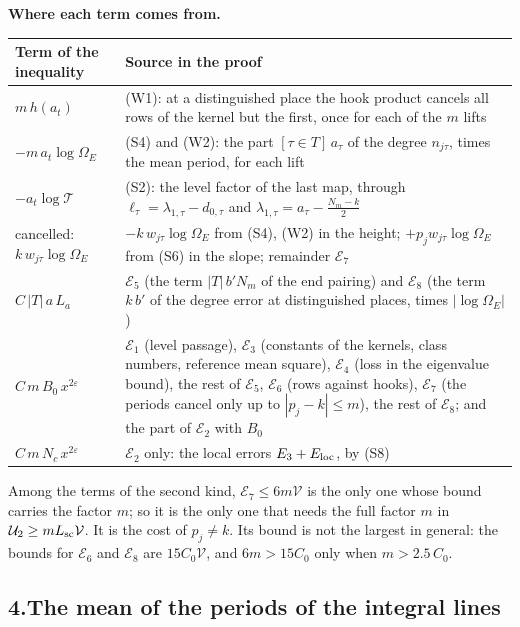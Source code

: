 \documentclass[11pt,letterpaper]{article}
\begin{document}
\medskip
\noindent\textbf{Where each term comes from.}
\begin{center}\small
\begin{tabular}{p{}p{}}
\toprule
Term of the inequality & Source in the proof\\
\midrule
$m\,h(a_t)$ & (W1): at a distinguished place the hook product cancels all rows of the kernel but the
first, once for each of the $m$ lifts\\
$-m\,a_t\log\Omega_E$ & (S4) and (W2): the part $[\tau\in T]\,a_\tau$ of the degree $n_{j\tau}$, times the
mean period, for each lift\\
$-a_t\log\mathcal T$ & (S2): the level factor of the last map, through
$\ell_\tau=\lambda_{1,\tau}-d_{0,\tau}$ and $\lambda_{1,\tau}=a_\tau-\frac{N_m-k}2$\\
cancelled: $k\,w_{j\tau}\log\Omega_E$ & $-k\,w_{j\tau}\log\Omega_E$ from (S4), (W2) in the height;
$+p_jw_{j\tau}\log\Omega_E$ from (S6) in the slope; remainder $\mathcal E_7$\\
$C\,|T|\,a\,L_a$ & $\mathcal E_5$ (the term $|T|\,b'N_m$ of the end pairing) and $\mathcal E_8$ (the term
$k\,b'$ of the degree error at distinguished places, times $|\log\Omega_E|$)\\
$C\,m\,B_0\,x^{2\varepsilon}$ & $\mathcal E_1$ (level passage), $\mathcal E_3$ (constants of the kernels,
class numbers, reference mean square), $\mathcal E_4$ (loss in the eigenvalue bound), the rest of
$\mathcal E_5$, $\mathcal E_6$ (rows against hooks), $\mathcal E_7$ (the periods cancel only up to
$|p_j-k|\le m$), the rest of $\mathcal E_8$; and the part of $\mathcal E_2$ with $B_0$\\
$C\,m\,N_c\,x^{2\varepsilon}$ & $\mathcal E_2$ only: the local errors $E_3+E_{\rm loc}$, by (S8)\\
\bottomrule
\end{tabular}
\end{center}
Among the terms of the second kind, $\mathcal E_7\le6m\mathcal V$ is the only one whose bound carries the
factor $m$; so it is the only one that needs the full factor $m$ in
$\mathcal U_2\ge mL_{\rm sc}\mathcal V$. It is the cost of $p_j\ne k$. Its bound is not the largest in
general: the bounds for $\mathcal E_6$ and $\mathcal E_8$ are $15C_0\mathcal V$, and $6m>15C_0$ only when
$m>2.5\,C_0$.

\subsection*{4.\quad The mean of the periods of the integral lines}
\end{document}
